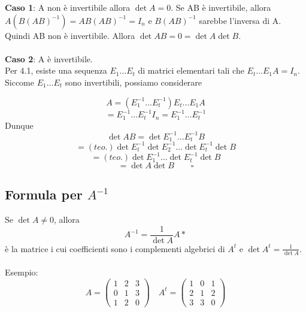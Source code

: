 \documentclass[12pt]{article}
\begin{document}
\textbf{Caso 1}: A non è invertibile allora $\det{A} = 0$. Se AB è invertibile, allora $A(B(AB)^{-1}) = AB(AB)^{-1} = I_n$ e $B(AB)^{-1}$ sarebbe l'inversa di A. Quindi AB non è invertibile. Allora $\det{AB} = 0 = \det{A}\det{B}$.\\\\
\textbf{Caso 2}: A è invertibile.\\
Per 4.1, esiste una sequenza $E_1 \dots E_t$ di matrici elementari tali che $E_t \dots E_1A = I_n$.\\
Siccome $E_1 \dots E_t$ sono invertibili, possiamo considerare

\[A = (E_1^{-1} \dots E_t^{-1})E_t \dots E_1A\]
\[= E_1^{-1} \dots E_t^{-1}I_n = E_1^{-1} \dots E_t^{-1}\]
Dunque
\[\det{AB} = \det{E_1^{-1} \dots E_t^{-1}B} \]
\[= (teo.) \det{E_t^{-1}}\det{E_2^{-1}} \dots \det{E_t^{-1}}\det{B}\]
\[= (teo.) \det{E_1^{-1} \dots \det{E_t^{-1}}} \det{B}\]
\[= \det{A}\det{B} \quad \quad \square\]

\subsection{Formula per $A^{-1}$}

Se $\det{A} \neq 0$, allora
\[A^{-1} = \frac{1}{\det{A}}A*\] è la matrice i cui coefficienti sono i complementi algebrici di $A^t$ e $\det{A^t} = \frac{1}{\det{A}}$.
\\\\
Esempio:
\[A = \begin{pmatrix}
    1 & 2 & 3\\
    0 & 1 & 3\\
    1 & 2 & 0
\end{pmatrix} \quad A^t = \begin{pmatrix}
    1 & 0 & 1\\
    2 & 1 & 2\\
    3 & 3 & 0
\end{pmatrix}\]
\end{document}
